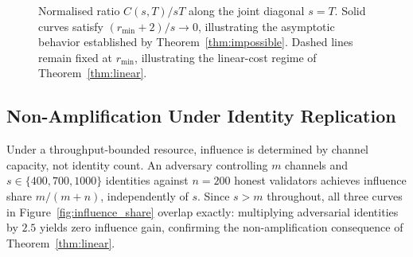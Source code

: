 \documentclass[manuscript,review]{acmart}
\theoremstyle{remark}
\begin{document}
	\begin{figure}[htbp]
		\centering
		\caption{Normalised ratio $C(s,T)/sT$ along the joint diagonal $s=T$. Solid curves satisfy $(r_{\min}+2)/s \to 0$, illustrating the asymptotic behavior established by Theorem~\ref{thm:impossible}. Dashed lines remain fixed at $r_{\min}$, illustrating the linear-cost regime of Theorem~\ref{thm:linear}.}
		\label{fig:joint_asymptotic}
	\end{figure}
	
	\subsection{Non-Amplification Under Identity Replication}
	\label{ssec:eval_nonamplification}
	
	Under a throughput-bounded resource, influence is determined by channel capacity, not identity count. An adversary controlling $m$ channels and $s\in\{400,700,1000\}$ identities against $n=200$ honest validators achieves influence share $m/(m+n)$, independently of $s$. Since $s>m$ throughout, all three curves in Figure~\ref{fig:influence_share} overlap exactly: multiplying adversarial identities by $2.5$ yields zero influence gain, confirming the non-amplification consequence of Theorem~\ref{thm:linear}.
	
\end{document}
